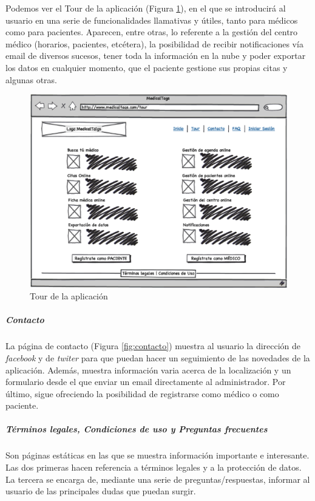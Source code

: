 \documentclass[a4paper,oneside,11pt]{book}
\begin{document}
		Podemos ver el Tour de la aplicación (Figura \ref{fig:tour}), en el que se introducirá al usuario en  una serie de funcionalidades llamativas y útiles, tanto para médicos como para pacientes. Aparecen, entre otras, lo referente a la gestión del centro médico (horarios, pacientes, etcétera), la posibilidad de recibir notificaciones vía email de diversos sucesos, tener toda la información en la nube y poder exportar los datos en cualquier momento, que el paciente gestione sus propias citas y algunas otras.
		
			\begin{figure}[H]
			  \centering
			    \includegraphics[width=12cm]{img/eps/4_Tour.eps}
			  \caption{Tour de la aplicación}
			  \label{fig:tour}
			\end{figure}
			
		
		\subparagraph{Contacto} %
		\label{par:contacto}
			La página de contacto (Figura \ref{fig:contacto}) muestra al usuario la dirección de \textit{facebook} y de \textit{twiter} para que puedan hacer un seguimiento de las novedades de la aplicación. Además, muestra información varia acerca de la localización y un formulario desde el que enviar un email directamente al administrador. Por último, sigue ofreciendo la posibilidad de registrarse como médico o como paciente.
		
		\subparagraph{Términos legales, Condiciones de uso y Preguntas frecuentes} %
		\label{par:terminos_legales_y_condiciones_de_uso}
			Son páginas estáticas en las que se muestra información importante e interesante. Las dos primeras hacen referencia a términos legales y a la protección de datos. La tercera se encarga de, mediante una serie de preguntas/respuestas, informar al usuario de las principales dudas que puedan surgir.
		
\end{document}
